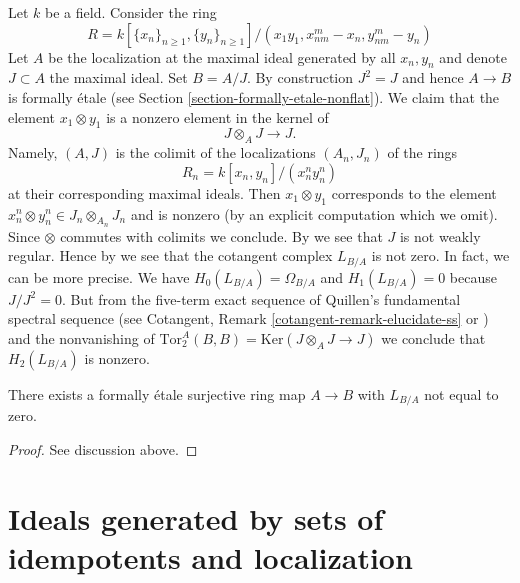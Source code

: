 \noindent
Let $k$ be a field. Consider the ring
$$
R = k[\{x_n\}_{n \geq 1}, \{y_n\}_{n \geq 1}]/(
x_1y_1, x_{nm}^m - x_n, y_{nm}^m - y_n)
$$
Let $A$ be the localization at the maximal ideal generated by
all $x_n, y_n$ and denote $J \subset A$ the maximal ideal. Set $B = A/J$.
By construction $J^2 = J$ and hence $A \to B$ is formally \'etale (see
Section \ref{section-formally-etale-nonflat}).
We claim that the element $x_1 \otimes y_1$ is a nonzero
element in the kernel of
$$
J \otimes_A J \longrightarrow J.
$$
Namely, $(A, J)$ is the colimit of the localizations
$(A_n, J_n)$ of the rings
$$
R_n = k[x_n, y_n]/(x_n^n y_n^n)
$$
at their corresponding maximal ideals. Then
$x_1 \otimes y_1$ corresponds to the element
$x_n^n \otimes y_n^n \in J_n \otimes_{A_n} J_n$ and is nonzero
(by an explicit computation which we omit). Since $\otimes$ commutes
with colimits we conclude. By
\cite[III Section 3.3]{cotangent}
we see that $J$ is not weakly regular. Hence by
\cite[III Proposition 3.3.3]{cotangent}
we see that the cotangent complex $L_{B/A}$ is not zero. In fact, we can
be more precise. We have $H_0(L_{B/A}) = \Omega_{B/A}$ and
$H_1(L_{B/A}) = 0$ because $J/J^2 = 0$. But from the five-term exact sequence
of Quillen's fundamental spectral sequence
(see Cotangent, Remark \ref{cotangent-remark-elucidate-ss} or
\cite[Corollary 8.2.6]{Reinhard})
and the nonvanishing of
$\text{Tor}_2^A(B, B) = \text{Ker}(J \otimes_A J \to J)$ we conclude that
$H_2(L_{B/A})$ is nonzero.

\begin{lemma}
\label{lemma-formally-etale-nontrivial-cotangent-complex}
There exists a formally \'etale surjective ring map $A \to B$
with $L_{B/A}$ not equal to zero.
\end{lemma}

\begin{proof}
See discussion above.
\end{proof}















\section{Ideals generated by sets of idempotents and localization}
\label{section-ideal-locally-idempotents}

